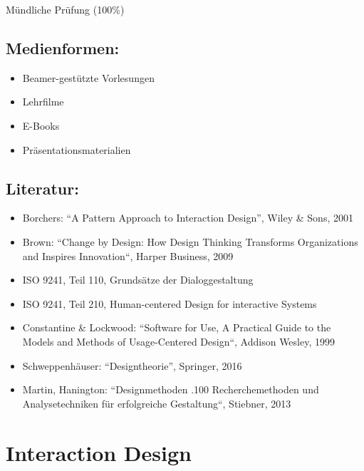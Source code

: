 Mündliche Prüfung (100\%)

\section*{Medienformen:\label{/mi-2017/modulbeschreibungen-master/MA_HCI_Design_Methodologies}}\label{medienformenpathlabelmi-2017modulbeschreibungen-mastermaux5fhciux5fdesignux5fmethodologies}

\begin{itemize}
\tightlist
\item
  Beamer-gestützte Vorlesungen
\item
  Lehrfilme
\item
  E-Books
\item
  Präsentationsmaterialien
\end{itemize}

\section*{Literatur:\label{/mi-2017/modulbeschreibungen-master/MA_HCI_Design_Methodologies}}\label{literaturpathlabelmi-2017modulbeschreibungen-mastermaux5fhciux5fdesignux5fmethodologies}

\begin{itemize}
\tightlist
\item
  Borchers: ``A Pattern Approach to Interaction Design'', Wiley \& Sons,
  2001
\item
  Brown: ``Change by Design: How Design Thinking Transforms
  Organizations and Inspires Innovation``, Harper Business, 2009
\item
  ISO 9241, Teil 110, Grundsätze der Dialoggestaltung
\item
  ISO 9241, Teil 210, Human-centered Design for interactive Systems
\item
  Constantine \& Lockwood: ``Software for Use, A Practical Guide to the
  Models and Methods of Usage-Centered Design``, Addison Wesley, 1999
\item
  Schweppenhäuser: ``Designtheorie'', Springer, 2016
\item
  Martin, Hanington: ``Designmethoden .100 Recherchemethoden und
  Analysetechniken für erfolgreiche Gestaltung``, Stiebner, 2013
\end{itemize}

\chapter{Interaction
Design\label{/mi-2017/modulbeschreibungen-master/MA_HCI_InteractionDesign}}\label{interaction-designpathlabelmi-2017modulbeschreibungen-mastermaux5fhciux5finteractiondesign}

